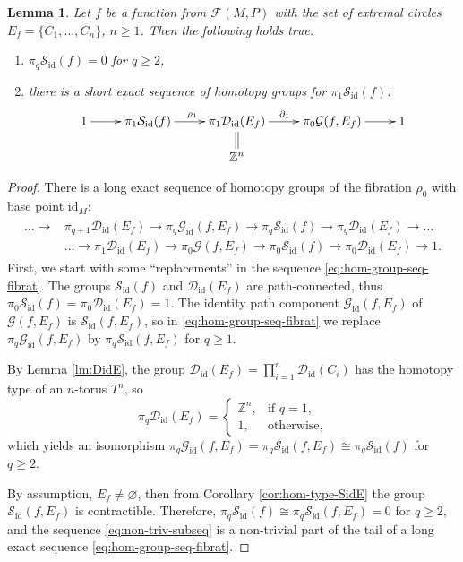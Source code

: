 \documentclass[10pt,reqno]{amsart}
\newtheorem{lemma}[subsection]{Lemma}
\newcommand{\bbZ}{\mathbb{Z}}
\newcommand{\Sid}{\mathcal{S}_{\id}(f)}
\newcommand{\F}{\mathcal{F}(M,P)}
\newcommand{\id}{\mathrm{id}}
\begin{document}
\begin{lemma}\label{lm:weak-Sid}
	Let  $f$ be a function from $\F$ with the set of extremal circles $E_f = \{C_1,\ldots, C_n\}$, $n\geq 1$. Then the following holds true:
	\begin{enumerate}
		\item ${\pi_q\Sid} = 0$ for $q\geq 2$,
		\item  there is a short exact sequence of homotopy groups for {$\pi_1\Sid$}:
		\begin{equation}\label{eq:non-triv-subseq}
			\xymatrix@R=0.5cm{
				1\ar[r]& {\pi_1\Sid} \ar[r]^{\rho_1}&\pi_1\mathcal{D}_{\id}(E_f) \ar@{=}[d] \ar[r]^{\partial_1}& \pi_0\mathcal{G}(f, E_f) \ar[r] & 1\\
				&& {\mathbb{Z}^n}		&		
			}
		\end{equation}
	\end{enumerate}
\end{lemma}
\begin{proof}
	There is a long exact sequence of homotopy groups of the fibration $\rho_0$ with base point $\id_M$:
	\begin{align}\label{eq:hom-group-seq-fibrat}
		\begin{split}
			\ldots \longrightarrow &\pi_{q+1}\mathcal{D}_{\id}(E_f) \longrightarrow \pi_{q} \mathcal{G}_{\id}(f, E_f)\longrightarrow\pi_q\Sid\longrightarrow \pi_q \mathcal{D}_{\id}(E_f) \longrightarrow\ldots\\
			&\ldots \longrightarrow\pi_1\mathcal{D}_{\id}(E_f)\longrightarrow \pi_0\mathcal{G}(f, E_f)\longrightarrow \pi_0\Sid\longrightarrow\pi_0\mathcal{D}_{\id}(E_f)\longrightarrow 1.
		\end{split}
	\end{align}
	First, we start with some ``replacements'' in the sequence \eqref{eq:hom-group-seq-fibrat}.
	The groups $\mathcal{S}_{\id}(f)$ and $\mathcal{D}_{\id}(E_f)$ are path-connected, thus $\pi_0\mathcal{S}_{\id}(f) = \pi_0\mathcal{D}_{\id}(E_f) = 1.$
	The identity path component $\mathcal{G}_{\id}(f, E_f)$ of $\mathcal{G}(f, E_f)$ is $\mathcal{S}_{\id}(f,E_f)$, so in \eqref{eq:hom-group-seq-fibrat} we replace $\pi_q\mathcal{G}_{\id}(f,E_f)$ by $\pi_q\mathcal{S}_{\id}(f,E_f)$ for $q\geq 1$.
	
	{ By Lemma \ref{lm:DidE},  the group $\mathcal{D}_{\id}(E_f) = \prod_{i = 1}^n\mathcal{D}_{\id}(C_i)$ has the homotopy type of an $n$-torus $T^n$, so }
	$$
	\pi_q\mathcal{D}_{\id}(E_f) = \begin{cases}
		\bbZ^n, & \text{if }q = 1,\\
		1, &\text{otherwise},
	\end{cases}
	$$
	which yields an isomorphism $\pi_q\mathcal{G}_{\id}(f, E_f) = \pi_q\mathcal{S}_{\id}(f,E_f)\cong \pi_q\Sid$ for $q\geq 2.$ 
	
	By assumption,  $E_f\neq\varnothing$, then from Corollary \ref{cor:hom-type-SidE} the group $\mathcal{S}_{\id}(f,E_f)$ is contractible. Therefore, $\pi_q\Sid \cong \pi_q\mathcal{S}_{\id}(f,E_f) = 0$ for $q\geq 2$, and
	the sequence  \eqref{eq:non-triv-subseq} is a non-trivial part of the tail of a long exact sequence \eqref{eq:hom-group-seq-fibrat}.
\end{proof}
\end{document}
